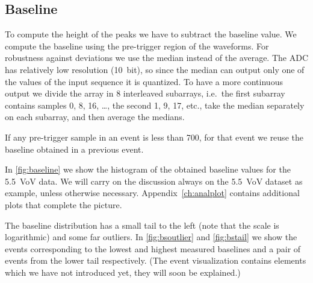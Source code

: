 \subsection{Baseline}

To compute the height of the peaks we have to subtract the baseline value. We
compute the baseline using the pre-trigger region of the waveforms. For
robustness against deviations we use the median instead of the average. The ADC
has relatively low resolution (10~bit), so since the median can output only one
of the values of the input sequence it is quantized. To have a more continuous
output we divide the array in 8 interleaved subarrays, i.e.\ the first subarray
contains samples 0, 8, 16, \dots, the second 1, 9, 17, etc., take the median
separately on each subarray, and then average the medians.

If any pre-trigger sample in an event is less than 700, for that event we reuse
the baseline obtained in a previous event.

In \autoref{fig:baseline} we show the histogram of the obtained baseline values
for the \SI{5.5}{VoV} data. We will carry on the discussion always on the
\SI{5.5}{VoV} dataset as example, unless otherwise necessary.
Appendix~\ref{ch:analplot} contains additional plots that complete the picture.

\begin{figure}
    
    
    
\end{figure}

The baseline distribution has a small tail to the left (note that the scale is
logarithmic) and some far outliers. In \autoref{fig:bsoutlier} and
\autoref{fig:bstail} we show the events corresponding to the lowest and highest
measured baselines and a pair of events from the lower tail respectively. (The
event visualization contains elements which we have not introduced yet, they
will soon be explained.)

\begin{figure}
    


\end{figure}

